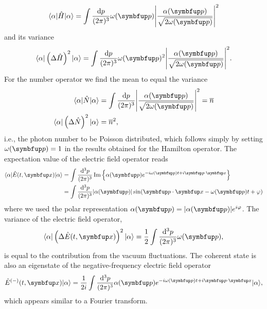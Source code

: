\begin{equation}
	\bra{\alpha}
	\hat{H}
	\ket{\alpha}
	=
	\int\frac{\dd{p}}{(2\pi)^3}
	\omega(\vb{p})
	\abs*{\frac{\alpha(\vb{p})}{\sqrt{2\omega(\vb{p})}}}^2
	\label{eq:coherent_state_hamilton_expval}
\end{equation}
and its variance
\begin{equation}
	\bra{\alpha}
	\left(
		\Delta
		\hat{H}
	\right)^2
	\ket{\alpha}
	=
	\int\frac{\dd{p}}{(2\pi)^3}
	\omega(\vb{p})^2
	\abs*{\frac{\alpha(\vb{p})}{\sqrt{2\omega(\vb{p})}}}^2
	\label{eq:coherent_state_hamilton_variance}
	.
\end{equation}
For the number operator we find the mean to equal the variance
\begin{align}
	\bra{\alpha}
	\hat{N}
	\ket{\alpha}
	&=
	\int\frac{\dd{p}}{(2\pi)^3}
	\abs*{\frac{\alpha(\vb{p})}{\sqrt{2\omega(\vb{p})}}}^2
	=
	\overline{n}
	\label{eq:coherent_state_number_expval}
	\\
	\bra{\alpha}
	\left(
		\Delta
		\hat{N}
	\right)^2
	\ket{\alpha}
	&=
	\overline{n}^2
	\label{eq:coherent_state_number_variance}
	,
\end{align}
i.e., the photon number to be Poisson distributed, which follows simply by setting $\omega(\vb{p})=1$ in the results obtained for the Hamilton operator.
The expectation value of the electric field operator reads
\begin{equation}
	\begin{split}
		\bra{\alpha}
		\hat{E}(t,\vb{x})
		\ket{\alpha}
		&=
		\int\frac{\dd[3]{p}}{(2\pi)^3}
		\Im\left\{
			\alpha(\vb{p})
			e^{-i\omega(\vb{p})t+i\vb{p}\vdot\vb{x}}
		\right\}
		\\
		&=
		\int\frac{\dd[3]{p}}{(2\pi)^3}
		\abs*{\alpha(\vb{p})}
		\sin\!\left(
			\vb{p}\vdot\vb{x}
			-
			\omega(\vb{p})t
			+
			\varphi
		\right)
	\end{split}
	\label{eq:coherent_state_electric_expval}
\end{equation}
where we used the polar representation $\alpha(\vb{p})=\abs*{\alpha(\vb{p})}e^{i\varphi}$.
The variance of the electric field operator,
\begin{equation}
	\bra{\alpha}
	\left(
		\Delta\hat{E}(t,\vb{x})
	\right)^2
	\ket{\alpha}
	=
	\frac{1}{2}
	\int\frac{\dd[3]{p}}{(2\pi)^3}
	\omega(\vb{p})
	,
	\label{eq:coherent_state_electric_variance}
\end{equation}
is equal to the contribution from the vacuum fluctuations.
The coherent state is also an eigenstate of the negative-frequency electric field operator
\begin{equation}
	\hat{E}^{(-)}(t,\vb{x})
	\ket{\alpha}
	=
	\frac{1}{2i}
	\int\frac{\dd[3]{p}}{(2\pi)^3}
	\alpha(\vb{p})
	e^{-i\omega(\vb{p})t+i\vb{p}\vdot\vb{x}}
	\ket{\alpha}
	\label{eq:coherent_state_eigenstate_electric}
	,
\end{equation}
which appears similar to a Fourier transform.


